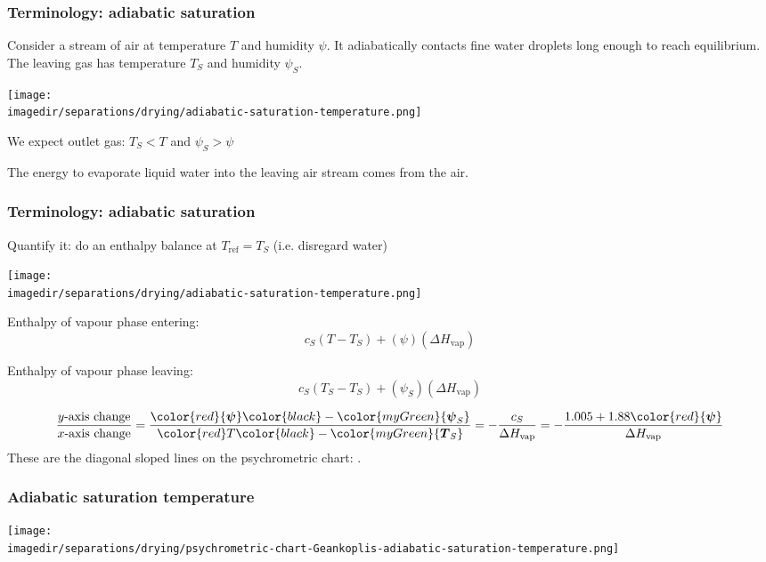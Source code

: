 \begin{frame}\frametitle{Terminology: adiabatic saturation}
	Consider a stream of air at temperature $T$ and humidity $\psi$. It adiabatically contacts fine water droplets long enough to reach equilibrium. The leaving gas has temperature $T_S$ and humidity $\psi_S$.

	\begin{center}
		\texttt{[image: \\imagedir/separations/drying/adiabatic-saturation-temperature.png]}
	\end{center}

	We expect outlet gas: $T_S < T$ and $\psi_S > \psi$
	
	\vspace{6pt}
	The energy to evaporate liquid water into the leaving air stream comes from the air.
\end{frame}

\begin{frame}\frametitle{Terminology: adiabatic saturation}
	Quantify it: do an enthalpy balance at $T_\text{ref} = T_S$ {\scriptsize (i.e. disregard water)}
	\begin{center}
		\texttt{[image: \\imagedir/separations/drying/adiabatic-saturation-temperature.png]}
	\end{center}
	\vspace{-6pt}
	\begin{exampleblock}{Enthalpy of vapour phase entering:}
		\[c_S\left(T - T_S \right) + (\psi) (\Delta H_\text{vap})\]
	\end{exampleblock}
	\begin{exampleblock}{Enthalpy of vapour phase leaving:}
		\[c_S\left(T_S - T_S \right) + (\psi_S) (\Delta H_\text{vap})\]
	\end{exampleblock}
	
	\[	
		\displaystyle \frac{y\text{-axis change}}{x\text{-axis change}} = \frac{\color{red}{\boldsymbol \psi} \color{black} - \color{myGreen}{\boldsymbol \psi_S}}{\color{red}T \color{black}- \color{myGreen}{\boldsymbol T_S}} = - \frac{c_S}{\Delta H_\text{vap}} = - \frac{1.005 + 1.88 \color{red}{\boldsymbol \psi}}{\Delta H_\text{vap}}
	\]
	These are the diagonal sloped lines on the psychrometric chart: {\color{purple}{adiabatic saturation curves}}.
\end{frame}

\begin{frame}\frametitle{Adiabatic saturation temperature}
	\vfill
	\begin{center}
		\texttt{[image: \\imagedir/separations/drying/psychrometric-chart-Geankoplis-adiabatic-saturation-temperature.png]}
	\end{center}
\end{frame}

